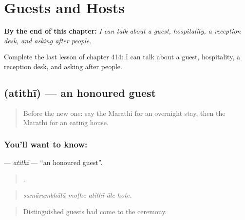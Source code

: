 
\chapter{Guests and Hosts}
\label{ch:mr-guests-and-hosts}

\begin{chapteropening}
\textbf{By the end of this chapter:} \emph{I can talk about a guest, hospitality, a reception desk, and asking after people.}

Complete the last lesson of chapter 414: I can talk about a guest, hospitality, a reception desk, and asking after people.
\end{chapteropening}

\section[\texorpdfstring{\mr{अतिथी} (atithī)}{अतिथी (atithī)}]{ (atithī) — an honoured guest}

\label{lesson:MR-C414-atithi}



\begin{quote}
Before the new one: say the Marathi for an overnight stay, then the Marathi for an eating house.
\end{quote}

\subsection*{You'll want to know: }
\textbf{} — \emph{atithī} — \textquotedblleft{}an honoured guest\textquotedblright{}.

\begin{quote}
    .
\end{quote}

\begin{quote}
\emph{samārambhālā moṭhe atithī āle hote.}
\end{quote}

\begin{quote}
Distinguished guests had come to the ceremony.
\end{quote}

